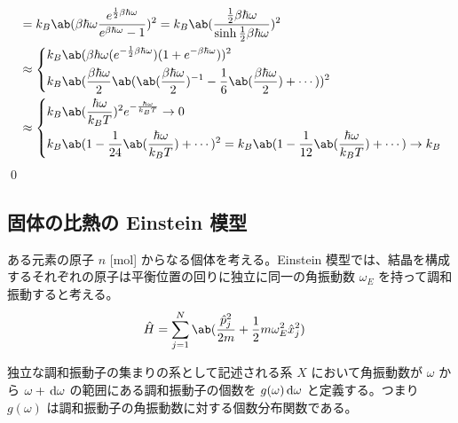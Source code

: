 \documentclass[uplatex,diffipdfmx,a4paper,11pt]{jlreq}
\makeatletter
\numberwithin{equation}{section}
\theoremstyle{definition}
\renewenvironment{proof}[1][\proofname]{\par
  \normalfont
  \topsep6\p@\@plus6\p@ \trivlist
  \item[\hskip\labelsep{\bfseries #1}\@addpunct{\bfseries}]\ignorespaces\quad\par
}{%
  \qed\endtrivlist\@endpefalse
}
\renewcommand\proofname{証明}
\makeatother
\begin{document}
\begin{proof}
\begin{align}
      & = k_B\ab(\beta\hbar\omega\frac{e^{\frac{1}{2}\beta\hbar\omega}}{e^{\beta\hbar\omega} - 1})^2 = k_B\ab(\frac{\frac{1}{2}\beta\hbar\omega}{\sinh\frac{1}{2}\beta\hbar\omega})^2 \\
      & \approx \begin{dcases}
                  k_B\ab(\beta\hbar\omega(e^{-\frac{1}{2}\beta\hbar\omega})(1 + e^{-\beta\hbar\omega}))^2                                             \\
                  k_B\ab(\frac{\beta\hbar\omega}{2}\ab(\ab(\frac{\beta\hbar\omega}{2})^{-1} - \frac{1}{6}\ab(\frac{\beta\hbar\omega}{2}) + \cdots))^2 \\
                \end{dcases}                                                                               \\
      & \approx \begin{dcases}
                  k_B\ab(\frac{\hbar\omega}{k_BT})^2e^{-\frac{\hbar\omega}{k_BT}} \to 0 \\
                  k_B\ab(1 - \frac{1}{24}\ab(\frac{\hbar\omega}{k_BT}) + \cdots)^2 = k_B\ab(1 - \frac{1}{12}\ab(\frac{\hbar\omega}{k_BT}) + \cdots) \to k_B
                \end{dcases}
  \end{align}
\end{proof}


\subsection{固体の比熱の Einstein 模型}
ある元素の原子 $n$ [\si{mol}] からなる個体を考える。Einstein 模型では、結晶を構成するそれぞれの原子は平衡位置の回りに独立に同一の角振動数 $\omega_E$ を持って調和振動すると考える。
\begin{align}
  \hat{H} & = \sum_{j=1}^{N}\ab(\frac{\hat{p}_j^2}{2m} + \frac{1}{2}m\omega_E^2\hat{x}_j^2)
\end{align}

独立な調和振動子の集まりの系として記述される系 $X$ において角振動数が $\omega$ から $\omega + \dl{\omega}$ の範囲にある調和振動子の個数を $g(\omega)\dl{\omega}$ と定義する。つまり $g(\omega)$ は調和振動子の角振動数に対する個数分布関数である。
\end{document}
